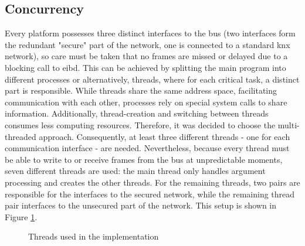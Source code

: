 \subsection{Concurrency}
Every platform possesses three distinct interfaces to the bus (two interfaces form the redundant "secure" part of the network, one is connected
to a standard \gls{knx} network), so care must be taken that no frames are missed or delayed due to a blocking call to \gls{eibd}. This can be achieved by splitting the main program into different 
processes or alternatively, threads, where for each critical task, a distinct part is responsible. While threads share the same address space, facilitating communication with
each other, processes rely on special system calls 
to share information. Additionally, thread-creation and switching between threads consumes less computing resources. Therefore, it was decided to choose the multi-threaded
approach. Consequently, at least three different threads - one for each communication interface - are needed. Nevertheless, because every thread must be able to write to or receive
frames from the bus at unpredictable moments, seven different threads are used: the main thread only handles argument processing and creates the other threads. For the remaining threads,
two pairs are responsible for the interfaces to the secured network, while the remaining thread pair interfaces to the unsecured part of the network. This setup is shown in
Figure \ref{fig:Concthreads}.
\begin{figure}[h]
\centering
{}
\caption{Threads used in the implementation}
\label{fig:Concthreads}
\end{figure}
